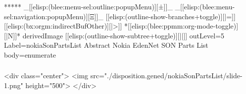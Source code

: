 \begin{whenOrg}
*****  _[[elisp:(blee:menu-sel:outline:popupMenu)][±]]_ _[[elisp:(blee:menu-sel:navigation:popupMenu)][Ξ]]_ [[elisp:(outline-show-branches+toggle)][|=]] [[elisp:(bx:orgm:indirectBufOther)][|>]] *[[elisp:(blee:ppmm:org-mode-toggle)][|N]]*  derivedImage [[elisp:(outline-show-subtree+toggle)][||]] outLevel=5 Label=nokiaSonPartsList Abstract Nokia EdenNet SON Parts List body=enumerate

\end{whenOrg}

\begin{htmlonly}

\begin{frame}[fragile,plain,label=nokiaSonPartsList]
    \frametitle{}
    \framesubtitle{}
    \begin{rawhtml}
<div class="center">
<img src="./disposition.gened/nokiaSonPartsList/slide-1.png" height="500">
</div>
    \end{rawhtml}
\end{frame}
\end{htmlonly}

